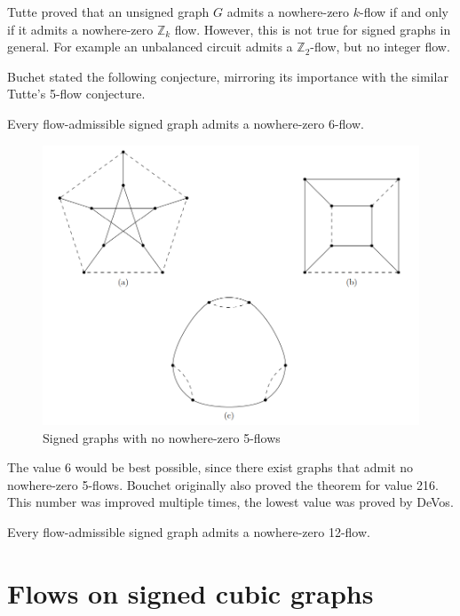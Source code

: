 Tutte\cite{tutte-proof} proved that an unsigned graph $G$ admits a nowhere-zero $k$-flow if and only if it admits a nowhere-zero $\mathbb{Z}_k$ flow. 
However, this is not true for signed graphs in general. For example an unbalanced circuit admits a $\mathbb{Z}_2$-flow, but no integer flow.

Buchet stated the following conjecture, mirroring its importance with the similar Tutte's 5-flow conjecture.

\begin{conjecture}
    Every flow-admissible signed graph admits a nowhere-zero 6-flow.
\end{conjecture}

\begin{figure}[ht]\label{fig:no-5-flow}
    \centering
    \includegraphics[scale=0.65]{images/petersen-no-5.png}
    \caption{Signed graphs with no nowhere-zero 5-flows}
\end{figure}

The value 6 would be best possible, since there exist graphs that admit no nowhere-zero 5-flows.
Bouchet originally also proved the theorem for value 216. This number was improved multiple times, 
the lowest value was proved by DeVos\cite{devos}.

\begin{theorem}[DeVos]
    Every flow-admissible signed graph admits a nowhere-zero 12-flow.
\end{theorem}

\section{Flows on signed cubic graphs}

